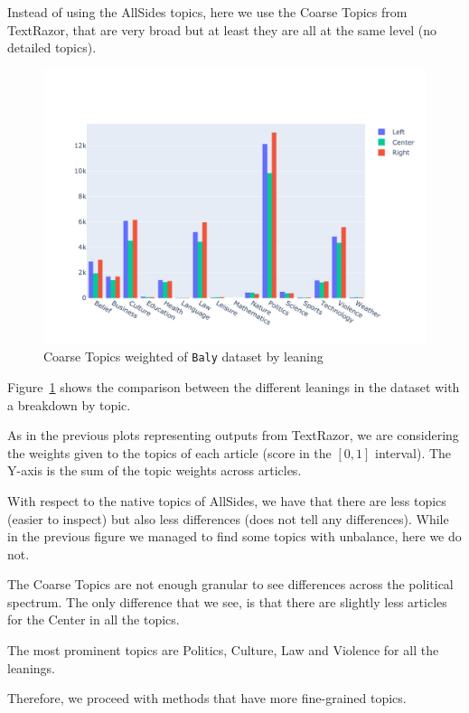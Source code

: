 Instead of using the AllSides topics, here we use the Coarse Topics from TextRazor, that are very broad but at least they are all at the same level (no detailed topics).

\begin{figure}[!htbp]
    \centering
    \includegraphics[width=\linewidth]{figures/baly_coarse_weighted_by_leaning.pdf}
    \caption{Coarse Topics weighted of \texttt{Baly} dataset by leaning}
    \label{fig:baly_coarse_weighted_by_leaning}
\end{figure}

Figure~\ref{fig:baly_coarse_weighted_by_leaning} shows the comparison between the different leanings in the dataset with a breakdown by topic.

As in the previous plots representing outputs from TextRazor, we are considering the weights given to the topics of each article (score in the $[0,1]$ interval). The Y-axis is the sum of the topic weights across articles.

With respect to the native topics of AllSides, we have that there are less topics (easier to inspect) but also less differences (does not tell any differences).
While in the previous figure we managed to find some topics with unbalance, here we do not.

The Coarse Topics are not enough granular to see differences across the political spectrum. The only difference that we see, is that there are slightly less articles for the Center in all the topics.

The most prominent topics are Politics, Culture, Law and Violence for all the leanings.

Therefore, we proceed with methods that have more fine-grained topics.

